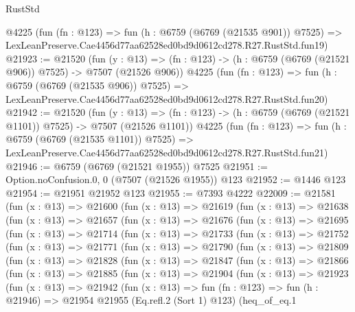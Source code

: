 \begin{lexlean}{RustStd}
\begin{coremodule}
    @4225
    (fun (fn : @123) =>
    fun (h : @6759 (@6769 (@21535 @901)) @7525) =>
    LexLeanPreserve.Cae4456d77aa62528ed0bd9d0612cd278.R27.RustStd.fun19)
@21923 := @21520
    (fun (y : @13) => (fn : @123) -> (h : @6759 (@6769 (@21521 @906)) @7525) -> @7507 (@21526 @906))
    @4225
    (fun (fn : @123) =>
    fun (h : @6759 (@6769 (@21535 @906)) @7525) =>
    LexLeanPreserve.Cae4456d77aa62528ed0bd9d0612cd278.R27.RustStd.fun20)
@21942 := @21520
    (fun (y : @13) =>
    (fn : @123) -> (h : @6759 (@6769 (@21521 @1101)) @7525) -> @7507 (@21526 @1101))
    @4225
    (fun (fn : @123) =>
    fun (h : @6759 (@6769 (@21535 @1101)) @7525) =>
    LexLeanPreserve.Cae4456d77aa62528ed0bd9d0612cd278.R27.RustStd.fun21)
@21946 := @6759 (@6769 (@21521 @1955)) @7525
@21951 := Option.noConfusion.{0, 0} (@7507 (@21526 @1955)) @123
@21952 := @1446 @123
@21954 := @21951 @21952 @123
@21955 := @7393 @4222
@22009 := @21581
    (fun (x : @13) =>
    @21600
      (fun (x : @13) =>
      @21619
        (fun (x : @13) =>
        @21638
          (fun (x : @13) =>
          @21657
            (fun (x : @13) =>
            @21676
              (fun (x : @13) =>
              @21695
                (fun (x : @13) =>
                @21714
                  (fun (x : @13) =>
                  @21733
                    (fun (x : @13) =>
                    @21752
                      (fun (x : @13) =>
                      @21771
                        (fun (x : @13) =>
                        @21790
                          (fun (x : @13) =>
                          @21809
                            (fun (x : @13) =>
                            @21828
                              (fun (x : @13) =>
                              @21847
                                (fun (x : @13) =>
                                @21866
                                  (fun (x : @13) =>
                                  @21885
                                    (fun (x : @13) =>
                                    @21904
                                      (fun (x : @13) =>
                                      @21923
                                        (fun (x : @13) =>
                                        @21942
                                          (fun (x : @13) =>
                                          fun (fn : @123) =>
                                          fun (h : @21946) =>
                                          @21954
                                            @21955
                                            (Eq.refl.{2} (Sort 1) @123)
                                            (heq_of_eq.{1}

\end{coremodule}
\end{lexlean}
